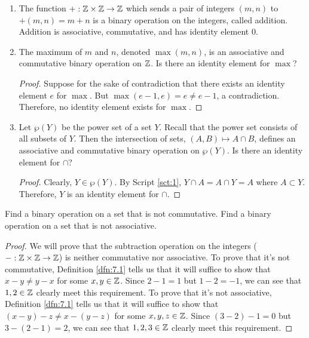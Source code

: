 \documentclass[../main.tex]{subfiles}
\begin{document}
\begin{examples}\label{xml:7.4}\leavevmode
    \begin{enumerate}
        \item The function $+:\mathbb{Z}\times\mathbb{Z}\to\mathbb{Z}$ which sends a pair of integers $(m,n)$ to $+(m,n)=m+n$ is a binary operation on the integers, called addition. Addition is associative, commutative, and has identity element 0.
        \item The maximum of $m$ and $n$, denoted $\max(m,n)$, is an associative and commutative binary operation on $\mathbb{Z}$. Is there an identity element for $\max$?
        \begin{proof}
            Suppose for the sake of contradiction that there exists an identity element $e$ for $\max$. But $\max(e-1,e)=e\neq e-1$, a contradiction. Therefore, no identity element exists for $\max$.
        \end{proof}
        \item Let $\wp(Y)$ be the power set of a set $Y$. Recall that the power set consists of all subsets of $Y$. Then the intersection of sets, $(A,B)\mapsto A\cap B$, defines an associative and commutative binary operation on $\wp(Y)$. Is there an identity element for $\cap$?
        \begin{proof}
            Clearly, $Y\in\wp(Y)$. By Script \ref{sct:1}, $Y\cap A=A\cap Y=A$ where $A\subset Y$. Therefore, $Y$ is an identity element for $\cap$.
        \end{proof}
    \end{enumerate}
\end{examples}

\begin{exercise}\label{exr:7.5}
    Find a binary operation on a set that is not commutative. Find a binary operation on a set that is not associative.
    \begin{proof}
        We will prove that the subtraction operation on the integers ($-:\mathbb{Z}\times\mathbb{Z}\to\mathbb{Z}$) is neither commutative nor associative. To prove that it's not commutative, Definition \ref{dfn:7.1} tells us that it will suffice to show that $x-y\neq y-x$ for some $x,y\in\mathbb{Z}$. Since $2-1=1$ but $1-2=-1$, we can see that $1,2\in\mathbb{Z}$ clearly meet this requirement. To prove that it's not associative, Definition \ref{dfn:7.1} tells us that it will suffice to show that $(x-y)-z\neq x-(y-z)$ for some $x,y,z\in\mathbb{Z}$. Since $(3-2)-1=0$ but $3-(2-1)=2$, we can see that $1,2,3\in\mathbb{Z}$ clearly meet this requirement.
    \end{proof}
\end{exercise}
\end{document}
